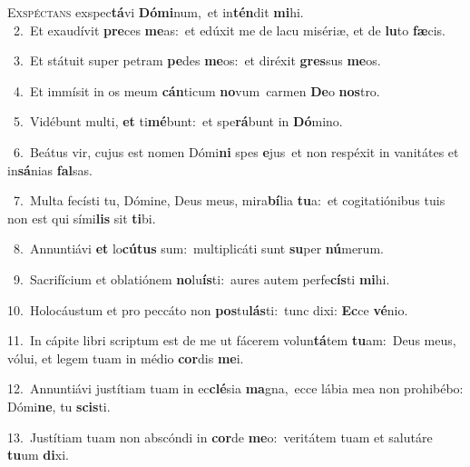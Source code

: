 \lettrine{\initial\textcolor{\initialcolor}{E}}{xspéctans} exspec\-\textbf{tá}\-vi \textbf{Dó}\-\textbf{mi}num,~\star et in\-\textbf{tén}\-dit \textbf{mi}\-hi.\\
{\numbfont\textcolor{\numbcolor}{~2.}}~Et exaudívit \textbf{pre}\-ces \textbf{me}\-as:~\star et edúxit me de lacu misériæ, et de \textbf{lu}\-to \textbf{fæ}\-cis.\par
{\numbfont\textcolor{\numbcolor}{~3.}}~Et státuit super petram \textbf{pe}\-des \textbf{me}\-os:~\star et diréxit \textbf{gres}\-sus \textbf{me}\-os.\par
{\numbfont\textcolor{\numbcolor}{~4.}}~Et immísit in os meum \textbf{cán}\-ticum \textbf{no}\-vum~\star carmen \textbf{De}\-o \textbf{nos}\-tro.\par
{\numbfont\textcolor{\numbcolor}{~5.}}~Vidébunt multi, \textbf{et} ti\-\textbf{mé}\-bunt:~\star et spe\-\textbf{rá}\-bunt in \textbf{Dó}\-mino.\par
{\numbfont\textcolor{\numbcolor}{~6.}}~Beátus vir, cujus est nomen Dómi\textbf{ni} spes \textbf{e}\-jus~\star et non respéxit in vanitátes et in\-\textbf{sá}\-nias \textbf{fal}\-sas.\par
{\numbfont\textcolor{\numbcolor}{~7.}}~Multa fecísti tu, Dómine, Deus meus, mira\-\textbf{bí}\-lia \textbf{tu}\-a:~\star et cogitatiónibus tuis non est qui sími\textbf{lis} sit \textbf{ti}\-bi.\par
{\numbfont\textcolor{\numbcolor}{~8.}}~Annuntiávi \textbf{et} lo\-\textbf{cú}\-\textbf{tus} sum:~\star multiplicáti sunt \textbf{su}\-per \textbf{nú}\-merum.\par
{\numbfont\textcolor{\numbcolor}{~9.}}~Sacrifícium et oblatiónem \textbf{no}\-lu\-\textbf{ís}\-ti:~\star aures autem perfe\-\textbf{cís}\-ti \textbf{mi}\-hi.\par
{\numbfont\textcolor{\numbcolor}{10.}}~Holocáustum et pro peccáto non \textbf{pos}\-tu\-\textbf{lás}\-ti:~\star tunc dixi: \textbf{Ec}\-ce \textbf{vé}\-nio.\par
{\numbfont\textcolor{\numbcolor}{11.}}~In cápite libri scriptum est de me ut fácerem volun\-\textbf{tá}\-tem \textbf{tu}\-am:~\star Deus meus, vólui, et legem tuam in médio \textbf{cor}\-dis \textbf{me}\-i.\par
{\numbfont\textcolor{\numbcolor}{12.}}~Annuntiávi justítiam tuam in ec\-\textbf{clé}\-sia \textbf{ma}\-gna,~\star ecce lábia mea non prohibébo: Dómi\-\textbf{ne}\-, tu \textbf{scis}\-ti.\par
{\numbfont\textcolor{\numbcolor}{13.}}~Justítiam tuam non abscóndi in \textbf{cor}\-de \textbf{me}\-o:~\star veritátem tuam et salutáre \textbf{tu}\-um \textbf{di}\-xi.\par
